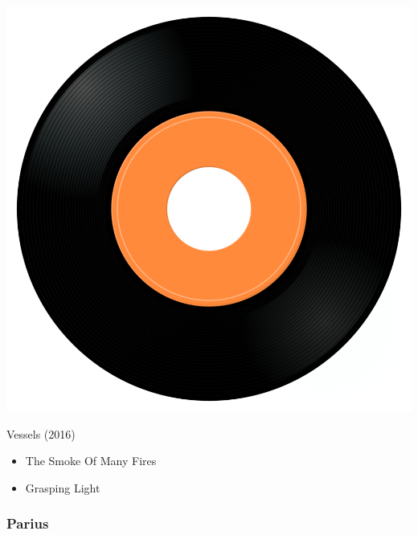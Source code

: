 \begin{minipage}[t]{0.25\textwidth}\vspace{0pt}
\captionsetup{type=figure}
\includegraphics[width=\textwidth]{Images/cover.png}
\caption*{Vessels (2016)}
\end{minipage}
\begin{minipage}[t]{0.25\textwidth}\vspace{0pt}
\begin{itemize}[nosep,leftmargin=1em,labelwidth=*,align=left]
	\setlength{\itemsep}{0pt}
	\item The Smoke Of Many Fires
	\item Grasping Light
\end{itemize}
\end{minipage}

\subsubsection{Parius}

